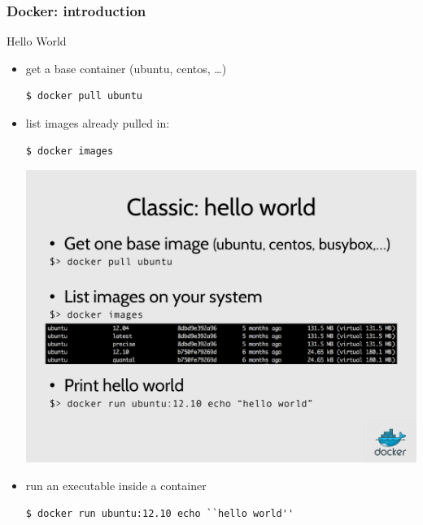\documentclass[9pt]{beamer}
\begin{document}

\begin{frame}[fragile]
  \frametitle{Docker: introduction}

  \begin{block}{}
    Hello World
    \begin{itemize}
      \item get a base container (ubuntu, centos, \ldots)
\begin{verbatim}
$ docker pull ubuntu
\end{verbatim}

      \item list images already pulled in:
\begin{verbatim}
$ docker images
\end{verbatim}
\begin{center}
  \includegraphics[width=1.0\linewidth]{figs/docker-images.pdf}
\end{center}

      \item run an executable inside a container
\begin{verbatim}
$ docker run ubuntu:12.10 echo ``hello world''
\end{verbatim}
    \end{itemize}

  \end{block}
\end{frame}
\end{document}
